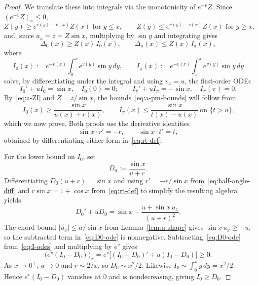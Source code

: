 \documentclass{amsart}
\begin{document}
\begin{proof}
We translate these into integrals via the monotonicity of $e^{-v}Z$.
Since $(e^{-v}Z)_x\leq 0$,
\[
Z(y)\geq e^{v(y)-v(x)}Z(x)\text{ for }y\leq x,\qquad
Z(y)\leq e^{v(y)-v(x)}Z(x)\text{ for }y\geq x,
\]
and, since $a_x=z=Z\sin x$, multiplying by $\sin y$ and integrating gives
\begin{equation}\label{eq:a-ZI}
\Delta_0(x)\geq Z(x)\,I_0(x),\qquad \Delta_\pi(x)\leq Z(x)\,I_\pi(x),
\end{equation}
where
\[
I_0(x):=e^{-v(x)}\int_0^x e^{v(y)}\sin y\,dy,\qquad
I_\pi(x):=e^{-v(x)}\int_x^\pi e^{v(y)}\sin y\,dy
\]
solve, by differentiating under the integral and using $v_x=u$, the
first-order ODEs
\begin{equation}\label{eq:I-odes}
I_0'+uI_0=\sin x,\quad I_0(0)=0;\qquad
I_\pi'+uI_\pi=-\sin x,\quad I_\pi(\pi)=0.
\end{equation}
By~\eqref{eq:a-ZI} and $Z=z/\sin x$, the bounds~\eqref{eq:a-pm-bounds} will follow from
\begin{equation}\label{eq:I-bounds}
I_0(x)\geq\frac{\sin x}{u(x)+r(x)},\qquad
I_\pi(x)\leq\frac{\sin x}{t(x)-u(x)}\ \text{on $\{t>u\}$,}
\end{equation}
which we now prove. Both proofs use the derivative identities
\begin{equation}\label{eq:half-angle-diff}
\sin x\cdot r'=-r,\qquad \sin x\cdot t'=t,
\end{equation}
obtained by differentiating either form in~\eqref{eq:rt-def}.

For the lower bound on $I_0$, set
\[
D_0:=\frac{\sin x}{u+r}.
\]
Differentiating
$D_0(u+r)=\sin x$ and using $r'=-r/\sin x$
from~\eqref{eq:half-angle-diff} and $r\sin x=1+\cos x$
from~\eqref{eq:rt-def} to simplify the resulting algebra yields
\begin{equation}\label{eq:D0-ode}
D_0'+uD_0=\sin x-\frac{u+\sin x\,u_x}{(u+r)^2}.
\end{equation}
The chord bound $|u_x|\leq u/\sin x$ from Lemma~\ref{lem:u-shape} gives
$\sin x\,u_x\geq -u$, so the subtracted term in~\eqref{eq:D0-ode} is
nonnegative. Subtracting~\eqref{eq:D0-ode} from~\eqref{eq:I-odes} and
multiplying by $e^v$ gives
\[
\bigl(e^v(I_0-D_0)\bigr)_x=e^v\bigl[(I_0-D_0)'+u(I_0-D_0)\bigr]\geq 0.
\]
As $x\to 0^+$, $u\to 0$ and $r\sim 2/x$, so $D_0\sim x^2/2$. Likewise
$I_0\sim\int_0^x y\,dy=x^2/2$. Hence $e^v(I_0-D_0)$ vanishes at $0$ and
is nondecreasing, giving $I_0\geq D_0$.


\end{proof}
\end{document}
